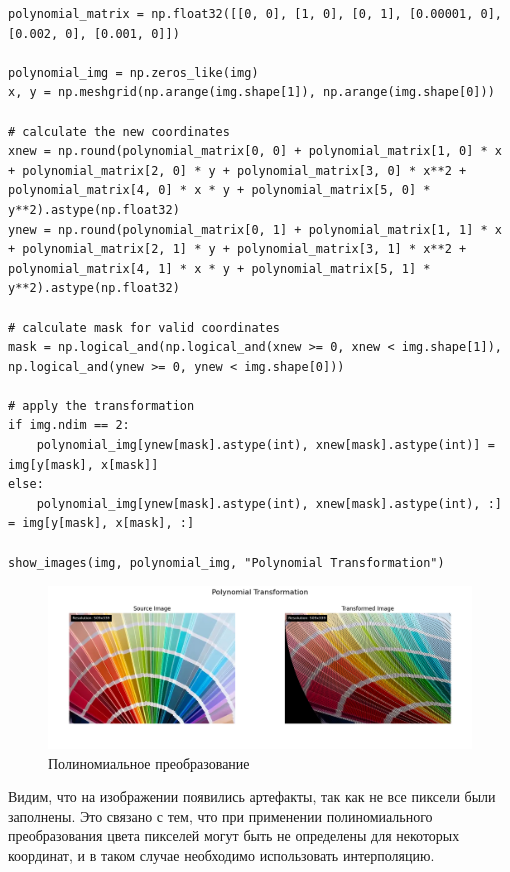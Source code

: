 \begin{lstlisting}[style=python_white, caption={Исходный код для полиномиального преобразования}]
polynomial_matrix = np.float32([[0, 0], [1, 0], [0, 1], [0.00001, 0], [0.002, 0], [0.001, 0]])

polynomial_img = np.zeros_like(img)
x, y = np.meshgrid(np.arange(img.shape[1]), np.arange(img.shape[0]))

# calculate the new coordinates
xnew = np.round(polynomial_matrix[0, 0] + polynomial_matrix[1, 0] * x + polynomial_matrix[2, 0] * y + polynomial_matrix[3, 0] * x**2 + polynomial_matrix[4, 0] * x * y + polynomial_matrix[5, 0] * y**2).astype(np.float32)
ynew = np.round(polynomial_matrix[0, 1] + polynomial_matrix[1, 1] * x + polynomial_matrix[2, 1] * y + polynomial_matrix[3, 1] * x**2 + polynomial_matrix[4, 1] * x * y + polynomial_matrix[5, 1] * y**2).astype(np.float32)

# calculate mask for valid coordinates
mask = np.logical_and(np.logical_and(xnew >= 0, xnew < img.shape[1]), np.logical_and(ynew >= 0, ynew < img.shape[0]))

# apply the transformation
if img.ndim == 2:
    polynomial_img[ynew[mask].astype(int), xnew[mask].astype(int)] = img[y[mask], x[mask]]
else:
    polynomial_img[ynew[mask].astype(int), xnew[mask].astype(int), :] = img[y[mask], x[mask], :]

show_images(img, polynomial_img, "Polynomial Transformation")
\end{lstlisting}

\begin{figure}[ht]
    \includegraphics[width=\textwidth]{../results/Polynomial Transformation.png}
    \caption{Полиномиальное преобразование}
    \label{fig:polynomial_image}
\end{figure}

Видим, что на изображении появились артефакты, так как не все пиксели были заполнены. Это связано с тем, что при применении полиномиального преобразования
цвета пикселей могут быть не определены для некоторых координат, и в таком случае необходимо использовать интерполяцию.


